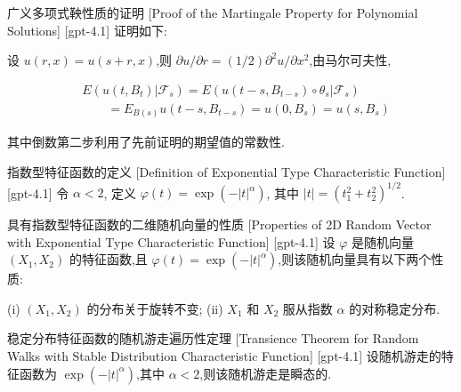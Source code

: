 \documentclass[UTF8]{ctexart}
\begin{document}
    
    
    \begin{prf}
        {广义多项式鞅性质的证明}
        [Proof of the Martingale Property for Polynomial Solutions]
        [gpt-4.1]
        证明如下:

设 $
u(r, x) = u(s + r, x)$,则 $\partial 
u / \partial r = (1/2) \partial^{2} 
u / \partial x^{2}$,由马尔可夫性,

\[
\begin{array}{rl}
& E(u(t, B_{t}) | \mathcal{F}_{s}) = E(
u(t - s, B_{t - s}) \circ \theta_{s} | \mathcal{F}_{s}) \\
& \qquad = E_{B(s)} 
u(t - s, B_{t - s}) = 
u(0, B_{s}) = u(s, B_{s})
\end{array}
\]

其中倒数第二步利用了先前证明的期望值的常数性.

    \end{prf}
    
    
    
    \begin{dfn}
        {指数型特征函数的定义}
        [Definition of Exponential Type Characteristic Function]
        [gpt-4.1]
        令 $\alpha < 2$, 定义 $\varphi(t) = \exp( - | t |^{\alpha} )$, 其中 $| t | = ( t_1^2 + t_2^2 )^{1/2}$.
    \end{dfn}
    
    
    
    \begin{ppt}
        {具有指数型特征函数的二维随机向量的性质}
        [Properties of 2D Random Vector with Exponential Type Characteristic Function]
        [gpt-4.1]
        设 $\varphi$ 是随机向量 $( X_1, X_2 )$ 的特征函数,且 $\varphi(t) = \exp( - | t |^{\alpha} )$,则该随机向量具有以下两个性质:

(i) $( X_1, X_2 )$ 的分布关于旋转不变;
(ii) $X_1$ 和 $X_2$ 服从指数 $\alpha$ 的对称稳定分布.
    \end{ppt}
    
    
    
    \begin{thm}
        {稳定分布特征函数的随机游走遍历性定理}
        [Transience Theorem for Random Walks with Stable Distribution Characteristic Function]
        [gpt-4.1]
        设随机游走的特征函数为 $\exp( - | t |^{\alpha} )$,其中 $\alpha < 2$,则该随机游走是瞬态的.
    \end{thm}
    
\end{document}
